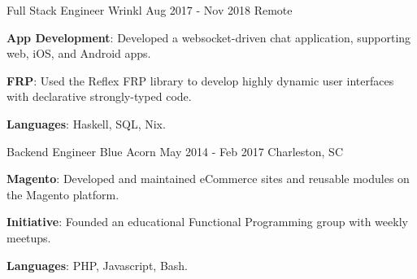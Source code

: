\begin{cventries}

  \cventry
    {Full Stack Engineer}
    {Wrinkl}
    {Aug 2017 - Nov 2018}
    {Remote}
    {
      \begin{cvitems}
        \item {\color{graytext}\textbf{App Development}}: Developed a
          websocket-driven chat application, supporting
          web, iOS, and Android apps.
        \item {\color{graytext}\textbf{FRP}}: Used the Reflex FRP library to
          develop highly dynamic user interfaces with declarative strongly-typed
          code.
        \item {\color{graytext}\textbf{Languages}}: Haskell, SQL, Nix.
      \end{cvitems}
    }


  \cventry
    {Backend Engineer} %
    {Blue Acorn} %
    {May 2014 - Feb 2017} %
    {Charleston, SC} %
    {
      \begin{cvitems} %
        \item {\color{graytext}\textbf{Magento}}: Developed and maintained
          eCommerce sites and reusable modules on the Magento platform.
        \item {\color{graytext}\textbf{Initiative}}: Founded an
          educational Functional Programming group with weekly meetups.
        \item {\color{graytext}\textbf{Languages}}: PHP, Javascript, Bash.
      \end{cvitems}
    }

\end{cventries}
